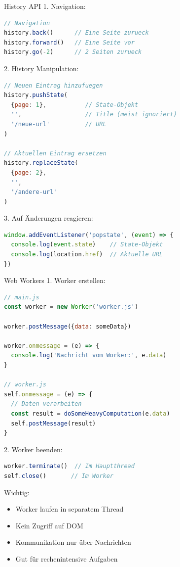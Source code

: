 \begin{KR}{History API}
1. Navigation:
\begin{lstlisting}[language=JavaScript, style=basesmol]
// Navigation
history.back()      // Eine Seite zurueck
history.forward()   // Eine Seite vor
history.go(-2)      // 2 Seiten zurueck
\end{lstlisting}

2. History Manipulation:
\begin{lstlisting}[language=JavaScript, style=basesmol]
// Neuen Eintrag hinzufuegen
history.pushState(
  {page: 1},           // State-Objekt
  '',                  // Title (meist ignoriert)
  '/neue-url'          // URL
)

// Aktuellen Eintrag ersetzen
history.replaceState(
  {page: 2},
  '',
  '/andere-url'
)
\end{lstlisting}

3. Auf Änderungen reagieren:
\begin{lstlisting}[language=JavaScript, style=basesmol]
window.addEventListener('popstate', (event) => {
  console.log(event.state)    // State-Objekt
  console.log(location.href)  // Aktuelle URL
})
\end{lstlisting}
\end{KR}

\begin{KR}{Web Workers}
1. Worker erstellen:
\begin{lstlisting}[language=JavaScript, style=basesmol]
// main.js
const worker = new Worker('worker.js')

worker.postMessage({data: someData})

worker.onmessage = (e) => {
  console.log('Nachricht vom Worker:', e.data)
}

// worker.js
self.onmessage = (e) => {
  // Daten verarbeiten
  const result = doSomeHeavyComputation(e.data)
  self.postMessage(result)
}
\end{lstlisting}

2. Worker beenden:
\begin{lstlisting}[language=JavaScript, style=basesmol]
worker.terminate()  // Im Hauptthread
self.close()       // Im Worker
\end{lstlisting}

Wichtig:
\begin{itemize}
  \item Worker laufen in separatem Thread
  \item Kein Zugriff auf DOM
  \item Kommunikation nur über Nachrichten
  \item Gut für rechenintensive Aufgaben
\end{itemize}
\end{KR}

